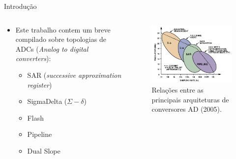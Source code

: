 \documentclass{beamer}
\begin{document}
\begin{frame}{Introdução}
	\begin{columns}
	    \begin{column}{0.50\textwidth}
			\begin{itemize}
				\justifying
				\item Este trabalho contem um breve compilado sobre topologias de ADCs (\textit{Analog to digital converters}):
				\begin{itemize}
					\justifying
					\item SAR (\textit{successive approximation register})
					\item SigmaDelta ($\Sigma - \delta$)
		 			\item Flash
					\item Pipeline
					\item Dual Slope
		    	\end{itemize}
		    \end{itemize}
	    \end{column}

	    \begin{column}{0.5\textwidth}
			\begin{figure}[H]
			    \centering
			    \begin{center}
			    \includegraphics[width=\textwidth]{img/adcs}
			  \caption{Relações entre as principais arquiteturas de conversores AD (2005).}
			    \label{fig:sar}
			  \end{center}
			\end{figure}
	    \end{column}
	\end{columns}
\end{frame}
\end{document}
